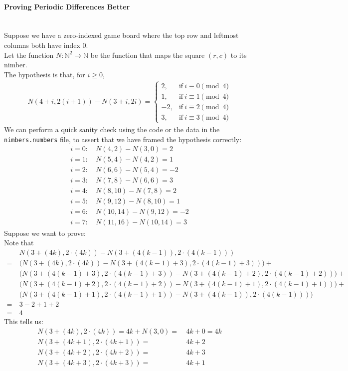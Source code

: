 \documentclass{article}
\newcommand{\N}{\mathbb{N}}
\begin{document}
\paragraph{Proving Periodic Differences Better}\mbox{}\\
Suppose we have a zero-indexed game board where the top row and
leftmost columns both have index 0. \\
Let the function $N : \N^2 \rightarrow \N$ be the function that maps the
square $(r,c)$ to its nimber. \\
The hypothesis is that, for $i \geq 0$,
\begin{align*}
  N(4 + i, 2(i + 1)) - N(3 + i, 2i) =
  \begin{cases}
    2, & \text{if} \: i \equiv 0 \pmod{4} \\
    1, & \text{if} \: i \equiv 1 \pmod{4} \\
    -2, & \text{if} \: i \equiv 2 \pmod{4} \\
    3, & \text{if} \: i \equiv 3 \pmod{4}
  \end{cases}
\end{align*}
We can perform a quick sanity check using the code or the data in the
\verb|nimbers.numbers| file, to assert that we have framed the hypothesis
correctly:
\begin{align*}
  i = 0: &\: N(4,2) - N(3,0) = 2 \\
  i = 1: &\: N(5,4) - N(4,2) = 1 \\
  i = 2: &\: N(6,6) - N(5,4) = -2 \\
  i = 3: &\: N(7,8) - N(6,6) = 3 \\
  i = 4: &\: N(8,10) - N(7,8) = 2 \\
  i = 5: &\: N(9,12) - N(8,10) = 1 \\
  i = 6: &\: N(10,14) - N(9,12) = -2 \\
  i = 7: &\: N(11,16) - N(10,14) = 3
\end{align*}
Suppose we want to prove: \\
Note that
\begin{align*}
  &\: N(3+(4k),2\cdot(4k))-N(3+(4(k-1)),2\cdot(4(k-1))) \\
  = &\: \big(N(3+(4k),2\cdot(4k))-N(3+(4(k-1)+3),2\cdot(4(k-1)+3))\big) + \\
  &\: \big(N(3+(4(k-1)+3),2\cdot(4(k-1)+3))-N(3+(4(k-1)+2),2\cdot(4(k-1)+2))\big) + \\
  &\: \big(N(3+(4(k-1)+2),2\cdot(4(k-1)+2))-N(3+(4(k-1)+1),2\cdot(4(k-1)+1))\big) + \\
  &\: \big(N(3+(4(k-1)+1),2\cdot(4(k-1)+1))-N(3+(4(k-1)),2\cdot(4(k-1)))\big) \\
  = &\: 3 - 2 + 1 + 2 \\
  = &\: 4
\end{align*}
This tells us:
\begin{align*}
  N(3+(4k),2\cdot(4k)) = 4k + N(3,0) = &\: 4k + 0 = 4k \\
  N(3+(4k+1),2\cdot(4k+1)) = &\: 4k + 2 \\
  N(3+(4k+2),2\cdot(4k+2)) = &\: 4k + 3 \\
  N(3+(4k+3),2\cdot(4k+3)) = &\: 4k + 1
\end{align*}
\newpage
\end{document}
